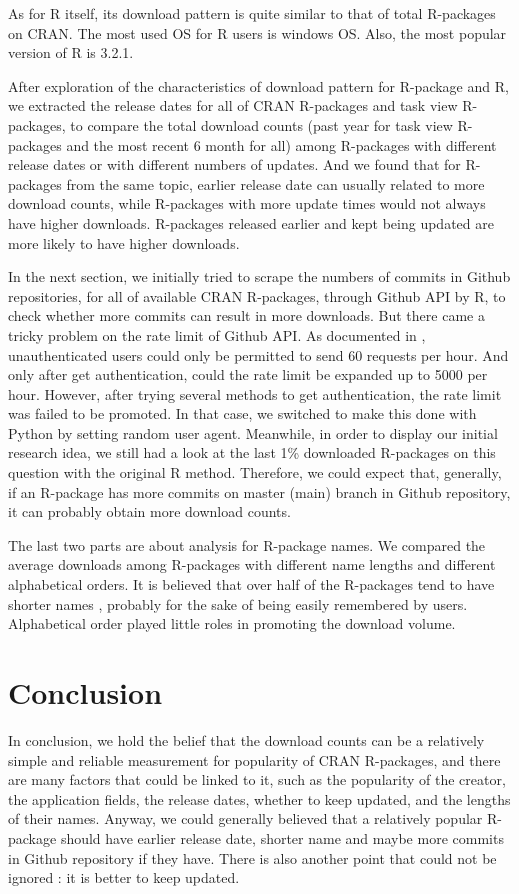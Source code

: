\documentclass[
]{book}
\begin{document}
As for R itself, its download pattern is quite similar to that of total R-packages on CRAN. The most used OS for R users is windows OS. Also, the most popular version of R is 3.2.1.

After exploration of the characteristics of download pattern for R-package and R, we extracted the release dates for all of CRAN R-packages and task view R-packages, to compare the total download counts (past year for task view R-packages and the most recent 6 month for all) among R-packages with different release dates or with different numbers of updates. And we found that for R-packages from the same topic, earlier release date can usually related to more download counts, while R-packages with more update times would not always have higher downloads. R-packages released earlier and kept being updated are more likely to have higher downloads.

In the next section, we initially tried to scrape the numbers of commits in Github repositories, for all of available CRAN R-packages, through Github API by R, to check whether more commits can result in more downloads. But there came a tricky problem on the rate limit of Github API. As documented in \textcite{githubapi}, unauthenticated users could only be permitted to send 60 requests per hour. And only after get authentication, could the rate limit be expanded up to 5000 per hour. However, after trying several methods to get authentication, the rate limit was failed to be promoted. In that case, we switched to make this done with Python by setting random user agent. Meanwhile, in order to display our initial research idea, we still had a look at the last 1\% downloaded R-packages on this question with the original R method. Therefore, we could expect that, generally, if an R-package has more commits on master (main) branch in Github repository, it can probably obtain more download counts.

The last two parts are about analysis for R-package names. We compared the average downloads among R-packages with different name lengths and different alphabetical orders. It is believed that over half of the R-packages tend to have shorter names , probably for the sake of being easily remembered by users. Alphabetical order played little roles in promoting the download volume.

\hypertarget{conclusion}{%
\chapter{Conclusion}\label{conclusion}}

In conclusion, we hold the belief that the download counts can be a relatively simple and reliable measurement for popularity of CRAN R-packages, and there are many factors that could be linked to it, such as the popularity of the creator, the application fields, the release dates, whether to keep updated, and the lengths of their names. Anyway, we could generally believed that a relatively popular R-package should have earlier release date, shorter name and maybe more commits in Github repository if they have. There is also another point that could not be ignored : it is better to keep updated.

\printbibliography
\end{document}

